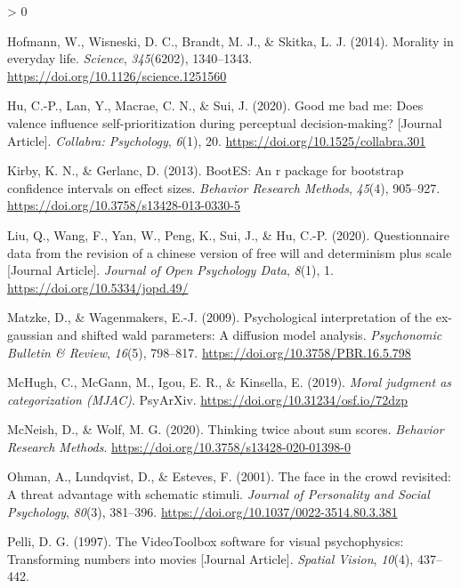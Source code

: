 \documentclass[
  english,
  man]{apa6}
\newlength{\cslhangindent}
\newenvironment{CSLReferences}[2] %
 {%
  \setlength{\parindent}{0pt}
  \ifodd #1 \everypar{\setlength{\hangindent}{\cslhangindent}}\ignorespaces\fi
  \ifnum #2 > 0
  \setlength{\parskip}{#2\baselineskip}
  \fi
 }%
 {}
\begin{document}
\begin{CSLReferences}{1}{0}
\leavevmode\hypertarget{ref-hofmann_morality_2014}{}%
Hofmann, W., Wisneski, D. C., Brandt, M. J., \& Skitka, L. J. (2014). Morality in everyday life. \emph{Science}, \emph{345}(6202), 1340--1343. \url{https://doi.org/10.1126/science.1251560}

\leavevmode\hypertarget{ref-Hu_2020_GoodSelf}{}%
Hu, C.-P., Lan, Y., Macrae, C. N., \& Sui, J. (2020). Good me bad me: Does valence influence self-prioritization during perceptual decision-making? {[}Journal Article{]}. \emph{Collabra: Psychology}, \emph{6}(1), 20. \url{https://doi.org/10.1525/collabra.301}

\leavevmode\hypertarget{ref-kirby_bootes_2013}{}%
Kirby, K. N., \& Gerlanc, D. (2013). {BootES}: An r package for bootstrap confidence intervals on effect sizes. \emph{Behavior Research Methods}, \emph{45}(4), 905--927. \url{https://doi.org/10.3758/s13428-013-0330-5}

\leavevmode\hypertarget{ref-Liu_2020_JOPD}{}%
Liu, Q., Wang, F., Yan, W., Peng, K., Sui, J., \& Hu, C.-P. (2020). Questionnaire data from the revision of a chinese version of free will and determinism plus scale {[}Journal Article{]}. \emph{Journal of Open Psychology Data}, \emph{8}(1), 1. \url{https://doi.org/10.5334/jopd.49/}

\leavevmode\hypertarget{ref-matzke_psychological_2009}{}%
Matzke, D., \& Wagenmakers, E.-J. (2009). Psychological interpretation of the ex-gaussian and shifted wald parameters: A diffusion model analysis. \emph{Psychonomic Bulletin \& Review}, \emph{16}(5), 798--817. \url{https://doi.org/10.3758/PBR.16.5.798}

\leavevmode\hypertarget{ref-mchugh_moral_2019}{}%
McHugh, C., McGann, M., Igou, E. R., \& Kinsella, E. (2019). \emph{Moral judgment as categorization ({MJAC})}. {PsyArXiv}. \url{https://doi.org/10.31234/osf.io/72dzp}

\leavevmode\hypertarget{ref-mcneish_thinking_2020}{}%
McNeish, D., \& Wolf, M. G. (2020). Thinking twice about sum scores. \emph{Behavior Research Methods}. \url{https://doi.org/10.3758/s13428-020-01398-0}

\leavevmode\hypertarget{ref-ohman_face_2001}{}%
Ohman, A., Lundqvist, D., \& Esteves, F. (2001). The face in the crowd revisited: A threat advantage with schematic stimuli. \emph{Journal of Personality and Social Psychology}, \emph{80}(3), 381--396. \url{https://doi.org/10.1037/0022-3514.80.3.381}

\leavevmode\hypertarget{ref-Pelli_1997}{}%
Pelli, D. G. (1997). The VideoToolbox software for visual psychophysics: Transforming numbers into movies {[}Journal Article{]}. \emph{Spatial Vision}, \emph{10}(4), 437--442.


\end{CSLReferences}
\end{document}
